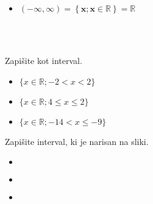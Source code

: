 \begin{itemize}
                    \item $ \mathbf{(-\infty,\infty)=\left\{x;x\in\mathbb{R}\right\} =\mathbb{R}}$ \\
                    
                    \begin{figure}[H]
                        \centering
                    \end{figure}

                \end{itemize}

            
            
                ~~\\~~

        
            \begin{naloga}
                Zapišite kot interval.
                \begin{itemize}
                        \item $\{x\in\mathbb{R}; -2<x<2\}$ 
                        \item $\{x\in\mathbb{R}; 4\leq x\leq 2\}$ 
                        \item $\{x\in\mathbb{R}; -14<x\leq -9\}$ 
                \end{itemize}
            \end{naloga}
        


        
            \begin{naloga}
                Zapišite interval, ki je narisan na sliki.
                \begin{itemize}
                        \item $ $ 
                        \item $ $ 
                        \item $ $ 
                \end{itemize}
            \end{naloga}
        


